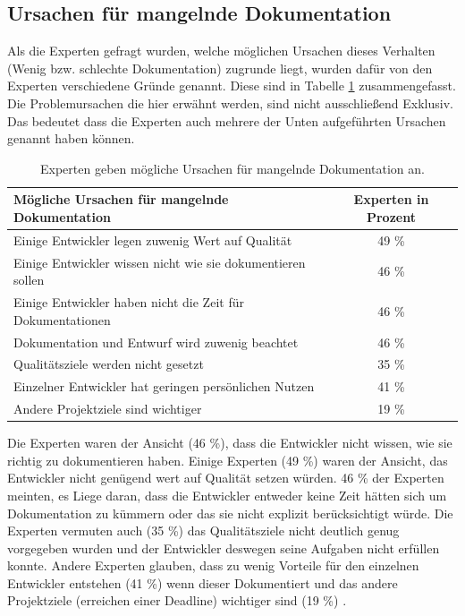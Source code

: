 \documentclass[a4paper,12pt,twoside]{scrartcl}
\begin{document}
\subsection{Ursachen für mangelnde Dokumentation}
Als die Experten gefragt wurden, welche möglichen Ursachen dieses Verhalten (Wenig bzw. schlechte Dokumentation) zugrunde liegt, wurden dafür von den Experten verschiedene Gründe genannt. Diese sind in Tabelle \ref{UrsachenTabelle} zusammengefasst. Die Problemursachen die hier erwähnt werden, sind nicht ausschließend Exklusiv. Das bedeutet dass die Experten auch mehrere der Unten aufgeführten Ursachen genannt haben können.
\begin{table}[htb]
\begin{tabular}{|l|c|}\hline
\rule{0pt}{15pt}\textbf{Mögliche Ursachen für mangelnde Dokumentation}  & \textbf{Experten in Prozent}
\\
\hline
\rule{0pt}{15pt} Einige Entwickler legen zuwenig Wert auf Qualität & 49 \% \\ 
\hline
\rule{0pt}{15pt} Einige Entwickler wissen nicht wie sie dokumentieren sollen & 46 \%\\
\hline
\rule{0pt}{15pt} Einige Entwickler haben nicht die Zeit für Dokumentationen & 46 \%\\
\hline
\rule{0pt}{15pt} Dokumentation und Entwurf wird zuwenig beachtet & 46 \%\\
\hline
\rule{0pt}{15pt} Qualitätsziele werden nicht gesetzt & 35 \%\\
\hline
\rule{0pt}{15pt} Einzelner Entwickler hat geringen persönlichen Nutzen & 41 \%\\
\hline
\rule{0pt}{15pt} Andere Projektziele sind wichtiger & 19 \%\\
\hline
\end{tabular}
\caption{Experten geben mögliche Ursachen für mangelnde Dokumentation an.}
\label{UrsachenTabelle}
\end{table}
Die Experten waren der Ansicht (46 \%), dass die Entwickler nicht wissen, wie sie richtig zu dokumentieren haben. Einige Experten (49 \%) waren der Ansicht, das Entwickler nicht genügend wert auf Qualität setzen würden. 46 \% der Experten meinten, es Liege daran, dass die Entwickler entweder keine Zeit hätten sich um Dokumentation zu kümmern oder das sie nicht explizit berücksichtigt würde. Die Experten vermuten auch (35 \%) das Qualitätsziele nicht deutlich genug vorgegeben wurden und der Entwickler deswegen seine Aufgaben nicht erfüllen konnte. Andere Experten glauben, dass zu wenig Vorteile für den einzelnen Entwickler entstehen (41 \%) wenn dieser Dokumentiert und das andere Projektziele (erreichen einer Deadline) wichtiger sind (19 \%) \cite{Prause2012}.
\end{document}

